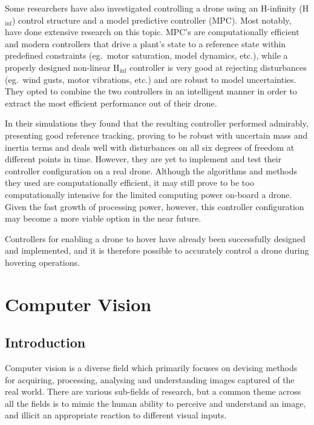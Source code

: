 Some researchers have also investigated controlling a drone using an H-infinity (H$_{\inf}$) control structure and a model predictive controller (MPC). Most notably,~\cite{raffo2010integral} have done extensive research on this topic. MPC's are computationally efficient and modern controllers that drive a plant's state to a reference state within predefined constraints (eg.\ motor saturation, model dynamics, etc.), while a properly designed non-linear H$_{\inf}$ controller is very good at rejecting disturbances (eg.\ wind gusts, motor vibrations, etc.) and are robust to model uncertainties. They opted to combine the two controllers in an intelligent manner in order to extract the most efficient performance out of their drone. 

In their simulations they found that the resulting controller performed admirably, presenting good reference tracking, proving to be robust with uncertain mass and inertia terms and deals well with disturbances on all six degrees of freedom at different points in time. However, they are yet to implement and test their controller configuration on a real drone. Although the algorithms and methods they used are computationally efficient, it may still prove to be too computationally intensive for the limited computing power on-board a drone. Given the fast growth of processing power, however, this controller configuration may become a more viable option in the near future. 

Controllers for enabling a drone to hover have already been successfully designed and implemented, and it is therefore possible to accurately control a drone during hovering operations. 

\section{Computer Vision}

\subsection{Introduction}

Computer vision is a diverse field which primarily focuses on devising methods for acquiring, processing, analysing and understanding images captured of the real world. There are various sub-fields of research, but a common theme across all the fields is to mimic the human ability to perceive and understand an image, and illicit an appropriate reaction to different visual inputs. 

